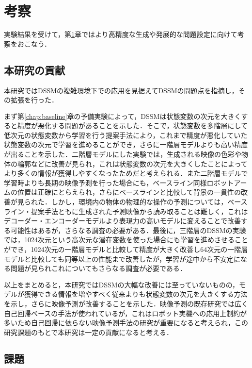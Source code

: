 \chapter{考察}
\label{chap:discussion}

実験結果を受けて，第\ref{chap:discussion}章ではより高精度な生成や発展的な問題設定に向けて考察をおこなう．

\section{本研究の貢献}

本研究ではDSSMの複雑環境下での応用を見据えてDSSMの問題点を指摘し，その拡張を行った．

まず第\ref{chap:baseline}章の予備実験によって，DSSMは状態変数の次元を大きくすると精度が悪化する問題があることを示した．そこで，状態変数を多階層にして低次元の状態変数から学習を行う提案手法により，これまで精度が悪化していた状態変数の次元で学習を進めることができ，さらに一階層モデルよりも高い精度が出ることを示した．二階層モデルにした実験では，生成される映像の色彩や物体の輪郭などに改善が見られ，これは状態変数の次元を大きくしたことによってより多くの情報が獲得しやすくなったためだと考えられる．また二階層モデルで学習時よりも長期の映像予測を行った場合にも，ベースライン同様ロボットアームの位置は正確にとらえられ，さらにベースラインと比較して背景の一貫性の改善が見られた．しかし，環境内の物体の物理的な操作の予測については，ベースライン・提案手法ともに生成された予測映像から読み取ることは難しく，これはデコーダー・エンコーダーモデルより表現力の高いモデルに変えることで改善する可能性はあるが，さらなる調査の必要がある．最後に，三階層のDSSMの実験では，1024次元という高次元な潜在変数を使った場合にも学習を進めさせることができ，1024次元の一階層モデルと比較して精度が大きく改善し64次元の一階層モデルと比較しても同等以上の性能まで改善したが，学習が途中から不安定になる問題が見られこれについてもさらなる調査が必要である．

以上をまとめると，本研究ではDSSMの大幅な改善には至っていないものの，モデルが獲得できる情報を増やすべく従来よりも状態変数の次元を大きくする方法を示し，さらに映像予測が改善することを示した．映像予測の既存研究では広く自己回帰ベースの手法が使われているが，これはロボット実機への応用上制約が多いため自己回帰に依らない映像予測手法の研究が重要になると考えられ，この研究課題のもとで本研究は一定の貢献になると考える．

\section{課題}

